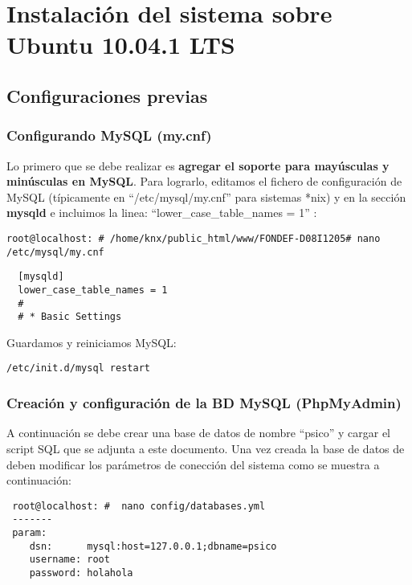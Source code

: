 \chapter{Instalación del sistema sobre Ubuntu 10.04.1 LTS}

\section{Configuraciones previas}

\subsection{Configurando  MySQL (my.cnf)}

Lo primero que se debe realizar es \textbf{agregar el soporte para mayúsculas y minúsculas en MySQL}. Para lograrlo, editamos el fichero de configuraci\'on de MySQL (típicamente en ``/etc/mysql/my.cnf'' para sistemas *nix) y en la secci\'on \textbf{mysqld} e incluimos la linea: ``lower\_case\_table\_names = 1'' :

\lstset{language=sh}
\begin{lstlisting}
root@localhost: # /home/knx/public_html/www/FONDEF-D08I1205# nano /etc/mysql/my.cnf
\end{lstlisting}


\lstset{language=sh}
\begin{lstlisting}
  [mysqld]
  lower_case_table_names = 1
  #
  # * Basic Settings
\end{lstlisting}

Guardamos y reiniciamos MySQL:

\lstset{language=sh}
\begin{lstlisting}
/etc/init.d/mysql restart
\end{lstlisting}
\newpage

\subsection{Creaci\'on y configuraci\'on de la BD MySQL (PhpMyAdmin)}

A continuaci\'on se debe crear una base de datos de nombre ``psico'' y cargar el script SQL que se adjunta a este documento. Una vez creada la base de datos de deben modificar los par\'ametros de conecci\'on del sistema como se muestra a continuaci\'on:


\lstset{language=sh}
\begin{lstlisting}
 root@localhost: #  nano config/databases.yml
 -------
 param:
    dsn:      mysql:host=127.0.0.1;dbname=psico
    username: root
    password: holahola
\end{lstlisting}


